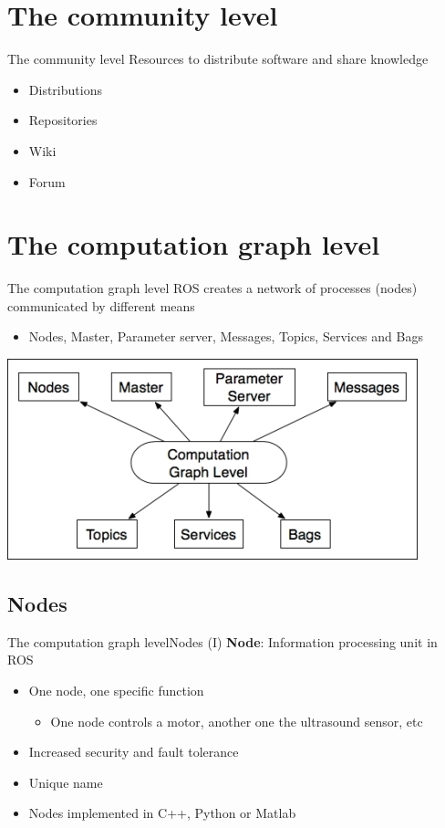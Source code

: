 \documentclass[10pt,compress]{beamer} %
\begin{document}
\section{The community level}
\begin{frame}{The community level}
	Resources to distribute software and share knowledge
  	\begin{itemize}
		\item Distributions
		\item Repositories
		\item Wiki
		\item Forum
	\end{itemize}
\end{frame}

\section{The computation graph level}
\begin{frame}{The computation graph level}
	ROS creates a network of processes (nodes) communicated by different means
  	\begin{itemize}
		\item Nodes, Master, Parameter server, Messages, Topics, Services and Bags
	\end{itemize}
	\begin{center}
	\includegraphics[width=0.5\linewidth]{figs/graph.jpg}
	\end{center}
\end{frame}

\subsection{Nodes}
\begin{frame}{The computation graph level}{Nodes (I)}
	\textbf{Node}: Information processing unit in ROS\\
	\begin{itemize}
	\item One node, one specific function
  	\begin{itemize}
		\item One node controls a motor, another one the ultrasound sensor, etc
	\end{itemize}
	\item Increased security and fault tolerance
	\item Unique name
	\item Nodes implemented in C++, Python or Matlab
	\end{itemize}
\end{frame}
\end{document}
